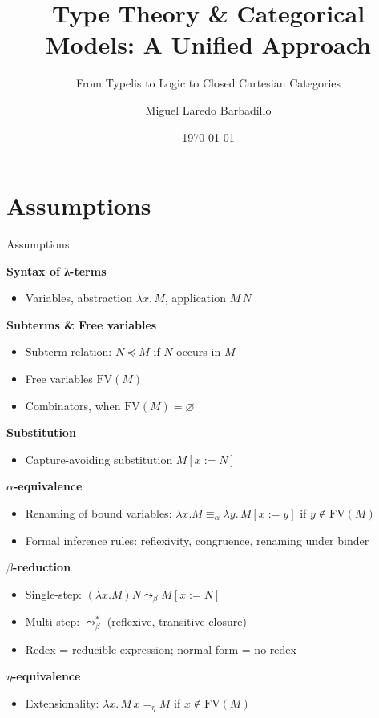 \documentclass[aspectratio=169]{beamer}
\title{Type Theory \& Categorical Models: A Unified Approach}
\subtitle{From Typelis to Logic to Closed Cartesian Categories}
\date{\today}
\author{Miguel Laredo Barbadillo}
\institute{Master's in Formal Methods in Computer Science}
\newcommand{\curly}{\mathrel{\leadsto}_\beta}
\begin{document}
\maketitle

\section{Assumptions}

\begin{frame}{Assumptions}
  
  \textbf{Syntax of λ-terms}
  \begin{itemize}
  \item Variables, abstraction $\lambda x.\,M$, application $M\,N$
  \end{itemize}
  
  \textbf{Subterms \& Free variables}
  \begin{itemize}
  \item Subterm relation: $N \preceq M$ if $N$ occurs in $M$
  \item Free variables $\mathrm{FV}(M)$
  \item Combinators, when $\mathrm{FV}(M)=\varnothing$
  \end{itemize}
  
  \textbf{Substitution}
  \begin{itemize}
  \item Capture-avoiding substitution $M[x:=N]$
  \end{itemize}

\end{frame}

\begin{frame}

  \textbf{$\alpha$-equivalence}
  \begin{itemize}
  \item Renaming of bound variables: $\lambda x.M \equiv_\alpha \lambda y.\,M[x:=y]$ if $y\notin\mathrm{FV}(M)$
  \item Formal inference rules: reflexivity, congruence, renaming under binder
  \end{itemize}

  \textbf{$\beta$-reduction}
  \begin{itemize}
  \item Single-step: $(\lambda x.M) N \curly M[x:=N]$
  \item Multi-step: $\curly^{*}$ (reflexive, transitive closure)
  \item Redex = reducible expression; normal form = no redex
  \end{itemize}

  \textbf{$\eta$-equivalence}
  \begin{itemize}
  \item Extensionality: $\lambda x.\,M\,x =_\eta M$ if $x\notin\mathrm{FV}(M)$
  \end{itemize}


\end{frame}
\end{document}
